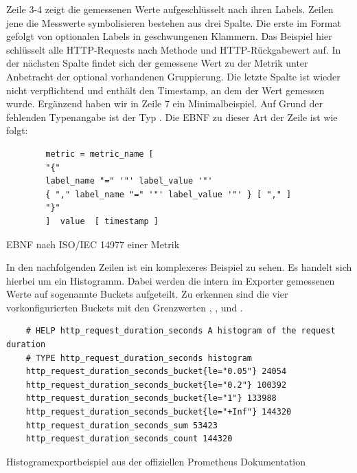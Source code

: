 Zeile 3-4 zeigt die gemessenen Werte aufgeschlüsselt nach ihren Labels. Zeilen jene die Messwerte symbolisieren bestehen aus drei Spalte. Die erste im Format  gefolgt von optionalen Labels in geschwungenen Klammern. Das Beispiel hier schlüsselt alle HTTP-Requests nach Methode und HTTP-Rückgabewert auf. In der nächsten Spalte findet sich der gemessene Wert zu der Metrik unter Anbetracht der optional vorhandenen Gruppierung. Die letzte Spalte ist wieder nicht verpflichtend und enthält den Timestamp, an dem der Wert gemessen wurde. 
Ergänzend haben wir in Zeile 7 ein Minimalbeispiel. Auf Grund der fehlenden Typenangabe ist der Typ . Die EBNF zu dieser Art der Zeile ist wie folgt:
\begin{listing}[H]
	\begin{samepage}
		\begin{verbatim}
		metric = metric_name [ 
		"{" 
		label_name "=" '"' label_value '"' 
		{ "," label_name "=" '"' label_value '"' } [ "," ] 
		"}" 
		]  value  [ timestamp ]
		\end{verbatim}
		\caption{EBNF nach ISO/IEC 14977 einer Metrik}
	\end{samepage}
\end{listing}

In den nachfolgenden Zeilen ist ein komplexeres Beispiel zu sehen. Es handelt sich hierbei um ein Histogramm. Dabei werden die intern im Exporter gemessenen Werte auf sogenannte Buckets aufgeteilt. Zu erkennen sind die vier vorkonfigurierten Buckets mit den Grenzwerten , ,  und . 
\begin{listing}[H]
	\begin{verbatim}
	# HELP http_request_duration_seconds A histogram of the request duration
	# TYPE http_request_duration_seconds histogram
	http_request_duration_seconds_bucket{le="0.05"} 24054
	http_request_duration_seconds_bucket{le="0.2"} 100392
	http_request_duration_seconds_bucket{le="1"} 133988
	http_request_duration_seconds_bucket{le="+Inf"} 144320
	http_request_duration_seconds_sum 53423
	http_request_duration_seconds_count 144320
	\end{verbatim}
	\caption{Histogramexportbeispiel aus der offiziellen Prometheus Dokumentation~\cite{PrometheusExpositionFormatBeispiel}}
\end{listing}

